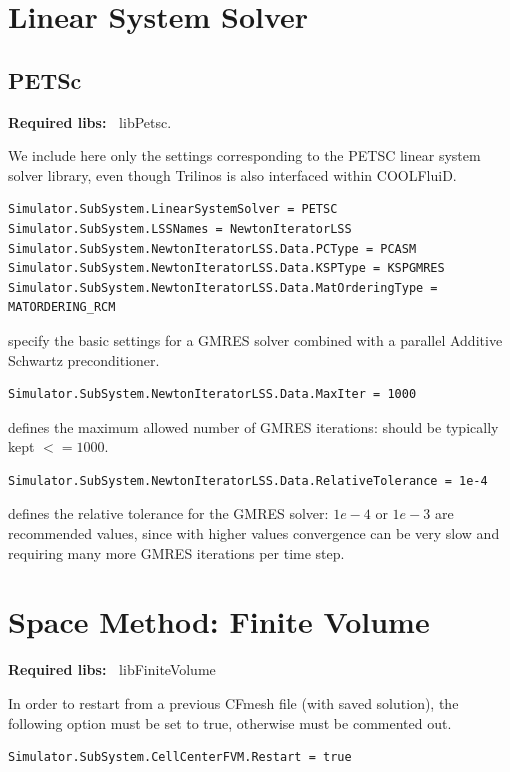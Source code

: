 \documentclass[11pt]{article}
\begin{document}
\section{Linear System Solver}

\subsection{PETSc}

{\bf Required libs:~} libPetsc.

We include here only the settings corresponding to the PETSC linear system solver library,
even though Trilinos is also interfaced within COOLFluiD.

\begin{verbatim}
Simulator.SubSystem.LinearSystemSolver = PETSC
Simulator.SubSystem.LSSNames = NewtonIteratorLSS
Simulator.SubSystem.NewtonIteratorLSS.Data.PCType = PCASM
Simulator.SubSystem.NewtonIteratorLSS.Data.KSPType = KSPGMRES
Simulator.SubSystem.NewtonIteratorLSS.Data.MatOrderingType = MATORDERING_RCM
\end{verbatim}
specify the basic settings for a GMRES solver combined with a parallel Additive Schwartz preconditioner.

\begin{verbatim}
Simulator.SubSystem.NewtonIteratorLSS.Data.MaxIter = 1000
\end{verbatim}
defines the maximum allowed number of GMRES iterations: should be typically kept $<= 1000$.

\begin{verbatim}
Simulator.SubSystem.NewtonIteratorLSS.Data.RelativeTolerance = 1e-4
\end{verbatim}
defines the relative tolerance for the GMRES solver: $1e-4$ or $1e-3$ are recommended values, since with higher values 
convergence can be very slow and requiring many more GMRES iterations per time step.

\section{Space Method: Finite Volume}

{\bf Required libs:~} libFiniteVolume

In order to restart from a previous CFmesh file (with saved solution), the following option must be set to true, 
otherwise must be commented out.
\begin{verbatim}
Simulator.SubSystem.CellCenterFVM.Restart = true
\end{verbatim}
\end{document}
